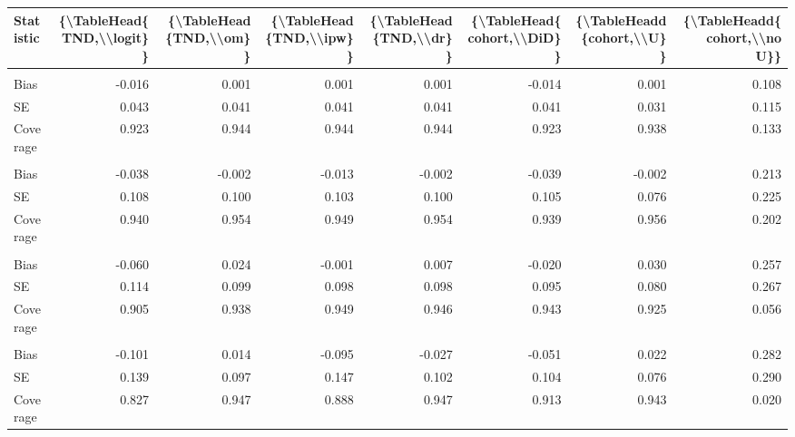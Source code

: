 \begin{table}
\centering
\begin{tabular}{lddddddd}
\toprule
Statistic & \{\textbackslash{}TableHead\{TND,\textbackslash{}\textbackslash{}logit\}\} & \{\textbackslash{}TableHead\{TND,\textbackslash{}\textbackslash{}om\}\} & \{\textbackslash{}TableHead\{TND,\textbackslash{}\textbackslash{}ipw\}\} & \{\textbackslash{}TableHead\{TND,\textbackslash{}\textbackslash{}dr\}\} & \{\textbackslash{}TableHead\{cohort,\textbackslash{}\textbackslash{}DiD\}\} & \{\textbackslash{}TableHeadd\{cohort,\textbackslash{}\textbackslash{}U\}\} & \{\textbackslash{}TableHeadd\{cohort,\textbackslash{}\textbackslash{}no U\}\}\\
\midrule
\addlinespace[0.3em]
\\
\hspace{1em}Bias & -0.016 & 0.001 & 0.001 & 0.001 & -0.014 & 0.001 & 0.108\\
\hspace{1em}SE & 0.043 & 0.041 & 0.041 & 0.041 & 0.041 & 0.031 & 0.115\\
\hspace{1em}Coverage & 0.923 & 0.944 & 0.944 & 0.944 & 0.923 & 0.938 & 0.133\\
\addlinespace[0.3em]
\\
\hspace{1em}Bias & -0.038 & -0.002 & -0.013 & -0.002 & -0.039 & -0.002 & 0.213\\
\hspace{1em}SE & 0.108 & 0.100 & 0.103 & 0.100 & 0.105 & 0.076 & 0.225\\
\hspace{1em}Coverage & 0.940 & 0.954 & 0.949 & 0.954 & 0.939 & 0.956 & 0.202\\
\addlinespace[0.3em]
\\
\hspace{1em}Bias & -0.060 & 0.024 & -0.001 & 0.007 & -0.020 & 0.030 & 0.257\\
\hspace{1em}SE & 0.114 & 0.099 & 0.098 & 0.098 & 0.095 & 0.080 & 0.267\\
\hspace{1em}Coverage & 0.905 & 0.938 & 0.949 & 0.946 & 0.943 & 0.925 & 0.056\\
\addlinespace[0.3em]
\\
\hspace{1em}Bias & -0.101 & 0.014 & -0.095 & -0.027 & -0.051 & 0.022 & 0.282\\
\hspace{1em}SE & 0.139 & 0.097 & 0.147 & 0.102 & 0.104 & 0.076 & 0.290\\
\hspace{1em}Coverage & 0.827 & 0.947 & 0.888 & 0.947 & 0.913 & 0.943 & 0.020\\
\bottomrule
\end{tabular}
\end{table}
